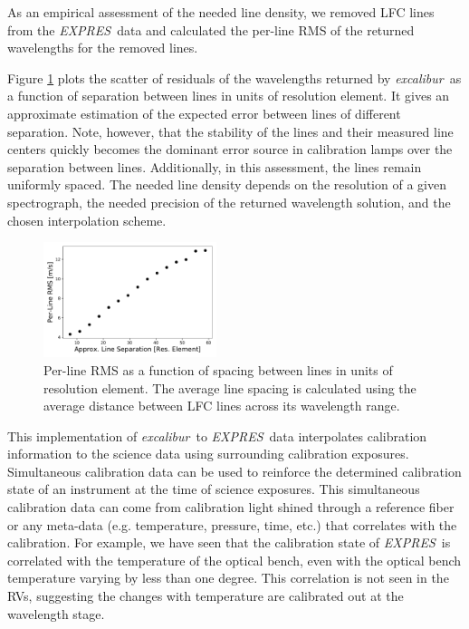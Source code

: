 \documentclass[twocolumn,table,xcolor,trackchanges]{aastex63}
\newcommand{\project}[1]{\textsl{#1}}
\newcommand{\name}{\project{excalibur}}
\newcommand{\acronym}[1]{{\small{#1}}}
\newcommand{\expres}{\project{\acronym{EXPRES}}}
\begin{document}
As an empirical assessment of the needed line density, we removed LFC lines from the \expres\ data and calculated the per-line RMS of the returned wavelengths for the removed lines.  

Figure \ref{fig:density} plots the scatter of residuals of the wavelengths returned by \name\ as a function of separation between lines in units of resolution element.  It gives an approximate estimation of the expected error between lines of different separation.  Note, however, that the stability of the lines and their measured line centers quickly becomes the dominant error source in calibration lamps over the separation between lines.  Additionally, in this assessment, the lines remain uniformly spaced.  The needed line density depends on the resolution of a given spectrograph, the needed precision of the returned wavelength solution, and the chosen interpolation scheme.

\begin{figure}[h]
\centering
\includegraphics[width=0.45\textwidth]{Figures/lfcDensityTest.pdf}
\caption{Per-line RMS as a function of spacing between lines in units of resolution element.  The average line spacing is calculated using the average distance between LFC lines across its wavelength range.}
\label{fig:density}
\end{figure}

This implementation of \name\ to \expres\ data interpolates calibration information to the science data using surrounding calibration exposures.  Simultaneous calibration data can be used to reinforce the determined calibration state of an instrument at the time of science exposures.  This simultaneous calibration data can come from calibration light shined through a reference fiber or any meta-data (e.g. temperature, pressure, time, etc.) that correlates with the calibration.  For example, we have seen that the calibration state of \expres\ is correlated with the temperature of the optical bench, even with the optical bench temperature varying by less than one degree.  This correlation is not seen in the RVs, suggesting the changes with temperature are calibrated out at the wavelength stage.
\end{document}
